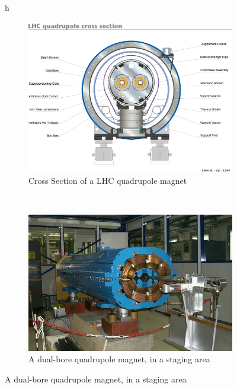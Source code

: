 \begin{figure}{h}
    \centering
    \begin{subfigure}[h]{0.450\textwidth}
        \includegraphics[width=\textwidth]{Figures/LHC_Diagrams/LHC_Quardupole_Schematic-1998-312.jpg}
        \caption{Cross Section of a LHC quadrupole magnet \cite{LHC:LHC_lhc_quadrupole_schematic_image}}\label{fig:lhc_quadrupole_xs}
      \end{subfigure}
      ~ %
    \begin{subfigure}[h]{0.450\textwidth}
        \includegraphics[width=\textwidth]{Figures/LHC_Diagrams/LHC_Quadrupole_TwinMagnets_Staged.jpg}
        \caption{A dual-bore quadrupole magnet, in a staging area
}
\end{subfigure}
\end{figure}
